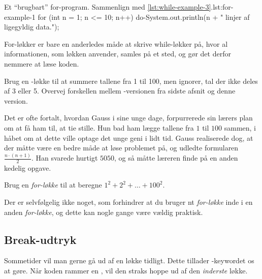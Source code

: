 		\begin{JavaCode}{Et ``brugbart'' for-program. Sammenlign med \autoref{lst:while-example-3}.}{lst:for-example-1}
			for (int n = 1; n <= 10; n++) {
				do-System.out.println(n + " linjer af ligegyldig data.");
			}
		\end{JavaCode}

        For-løkker er bare en anderledes måde at skrive while-løkker
        på, hvor al informationen, som løkken anvender, samles på et
        sted, og gør det derfor nemmere at læse koden.

		\begin{exercise}
            Brug en -løkke til at summere tallene
            fra 1 til 100, men ignorer, tal der ikke deles af 3 eller
            5. Overvej forskellen mellem -versionen
            fra sidste afsnit og denne version.
        \end{exercise}

		\begin{exercise}
			Det er ofte fortalt, hvordan Gauss i sine unge dage, forpurrerede sin
			lærers plan om at få ham til, at tie stille. Hun bad ham lægge tallene
			fra \(1\) til \(100\) sammen, i håbet om at dette ville optage det unge
			geni i lidt tid. Gauss realiserede dog, at der måtte være en bedre måde
			at løse problemet på, og udledte formularen \(\frac{n\cdot(n+1)}{2}\).
			Han svarede hurtigt \(5050\), og så måtte læreren finde på en anden
			kedelig opgave.
			
			
			Brug en \emph{for-løkke} til at beregne \(1^2+2^2+\dots+100^2\).
		\end{exercise}

		\begin{exercise}
			Der er selvfølgelig ikke noget, som forhindrer at du bruger nt
			\emph{for-løkke} inde i en anden \emph{for-løkke}, og dette kan nogle gange
			være vældig praktisk.

			\todo{Find på opgave!}
		\end{exercise}

	\subsection{Break-udtryk}

		Sommetider vil man gerne gå ud af en løkke tidligt. Dette tillader
        -keywordet os at gøre. Når koden rammer en
        , vil den straks hoppe ud af den
        \emph{inderste} løkke.

